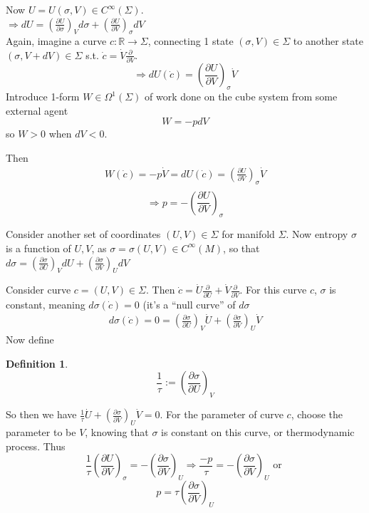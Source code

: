 \documentclass[twoside]{amsart}
\theoremstyle{plain}
\theoremstyle{definition}
\newtheorem{definition}{Definition}
\begin{document}
Now $U= U(\sigma,V) \in C^{\infty}(\Sigma)$.  \\
$\Longrightarrow dU = \left( \frac{\partial U}{ \partial \sigma} \right)_V d\sigma + \left( \frac{ \partial U}{ \partial V} \right)_{\sigma} dV$  \\
Again, imagine a curve $c: \mathbb{R}\to \Sigma$, connecting 1 state $(\sigma,V) \in \Sigma$ to another state $(\sigma, V+dV) \in \Sigma$ s.t. $\dot{c} = \dot{V} \frac{ \partial }{ \partial V}$.  
\[
\Longrightarrow dU(\dot{c}) = \left( \frac{ \partial U}{ \partial V} \right)_{\sigma}\dot{V}
\]
Introduce 1-form $W \in \Omega^1(\Sigma)$ of work done on the cube system from some external agent
\[
W = -pdV
\]
so $W >0$ when $dV <0$.  

Then
\[
\begin{gathered}
W(\dot{c}) = -p \dot{V} = dU(\dot{c}) = \left( \frac{ \partial U}{ \partial V} \right)_{\sigma} \dot{V} \\
\end{gathered}
\]
\begin{equation}
\Longrightarrow \boxed{ p = - \left( \frac{ \partial U}{ \partial V} \right)_{\sigma} }
\end{equation}

Consider another set of coordinates $(U,V) \in \Sigma$ for manifold $\Sigma$.  Now entropy $\sigma$ is a function of $U,V$, as $\sigma = \sigma(U,V) \in C^{\infty}(M)$, so that \\
$d\sigma = \left( \frac{ \partial \sigma}{ \partial U} \right)_V dU + \left( \frac{ \partial \sigma}{ \partial V} \right)_U dV$

Consider curve $c = (U,V) \in \Sigma$.  Then $\dot{c} = \dot{U} \frac{ \partial }{ \partial U} + \dot{V}\frac{ \partial }{ \partial V}$.  For this curve $c$, $\sigma$ is constant, meaning $d\sigma(\dot{c}) =0$ (it's a ``null curve'' of $d\sigma$
\[
\begin{gathered}
  d\sigma(\dot{c})=0 = \left( \frac{ \partial \sigma}{ \partial U} \right)_V \dot{U} + \left( \frac{ \partial \sigma}{ \partial V} \right)_U \dot{V} 
\end{gathered}
\]
Now define
\begin{definition}
\begin{equation}
  \frac{1}{\tau} := \left( \frac{ \partial \sigma }{ \partial U} \right)_V
\end{equation}
\end{definition}
So then we have $\frac{1}{\tau} \dot{U} + \left( \frac{ \partial \sigma}{ \partial V} \right)_U \dot{V} =0$.  For the parameter of curve $c$, choose the parameter to be $V$, knowing that $\sigma$ is constant on this curve, or thermodynamic process.  Thus
\[
\frac{1}{\tau} \left( \frac{ \partial U}{ \partial V} \right)_{\sigma} = -\left( \frac{ \partial \sigma}{ \partial V} \right)_U \Longrightarrow \frac{-p}{\tau} = - \left( \frac{ \partial \sigma}{ \partial V} \right)_{U} \text{ or }
\]
\begin{equation}
\boxed{ p = \tau \left( \frac{ \partial \sigma}{ \partial V} \right)_U }
\end{equation}
\end{document}
